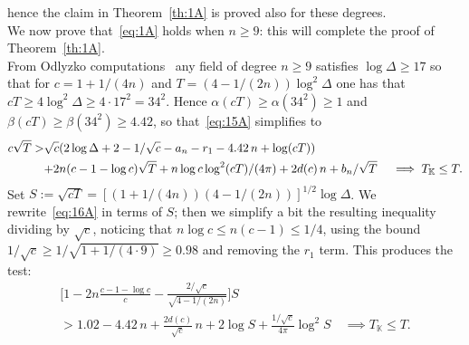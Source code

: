 \documentclass[a4paper,11pt]{amsart}
\newcommand{\field}[1]{\mathbb{{#1}}}
\newcommand{\K}{\field{{K}}}
\theoremstyle{remark}
\begin{document}
%
%
hence the claim in Theorem~\ref{th:1A} is proved also for these degrees. %
\smallskip\\
%
%
We now prove that~\eqref{eq:1A} holds when $n\geq 9$: this will complete the proof of Theorem~\ref{th:1A}.\\
%
From Odlyzko computations~\cite{Odlyzko:tables,Odlyzko2,Odlyzko3} any field of degree $n\geq 9$ satisfies
$\log\Delta\geq 17$
%
%
so that for $c = 1+1/(4n)$ and $T=(4-1/(2n))\log^2\Delta$ one has that $cT \geq 4\log^2\Delta \geq 4\cdot
17^2 = 34^2$. Hence $\alpha(cT)\geq \alpha(34^2) \geq 1$ and $\beta(cT)\geq \beta(34^2) \geq 4.42$,
so that~\eqref{eq:15A} simplifies to
\begin{align}
c \sqrt{T}
>&  \sqrt{c}(2\log \Delta + 2 - 1/\sqrt{c} - a_n - r_1 - 4.42\,n + \log(cT))              \notag     \\
&  {+} 2n (c-1-\log c)\sqrt{T} + n\log c\log^2(cT)/(4\pi) + 2d(c)\,n + b_n/\sqrt{T}
\quad
\implies T_\K \leq T.                                                                     \label{eq:16A}
\end{align}
%
Set $S := \sqrt{cT} = [(1+1/(4n))(4-1/(2n))]^{1/2}\log\Delta$.
%
We rewrite~\eqref{eq:16A} in terms of $S$; then we simplify a bit the resulting inequality dividing by
$\sqrt{c}$, noticing that $n\log c\leq n(c-1)\leq 1/4$, using the bound $1/\sqrt{c}\geq
1/\sqrt{1+1/(4\cdot 9)}\geq 0.98$ and removing the $r_1$ term. This produces the test:
%
\begin{multline}\label{eq:17A}
\Big[1 - 2n\frac{c-1-\log c}{c} - \frac{2/\sqrt{c}}{\sqrt{4-1/(2n)}}\Big] S\\
> 1.02 - 4.42\,n + \frac{2d(c)}{\sqrt{c}}\,n + 2\log S + \frac{1/\sqrt{c}}{4\pi}\log^2 S
\quad
\implies T_\K \leq T.
\end{multline}
\end{document}
